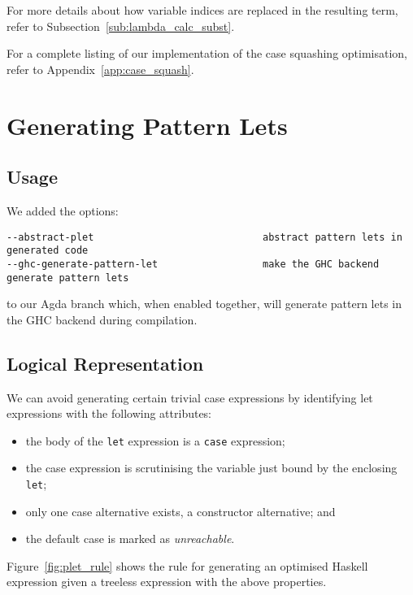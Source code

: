 For more details about how variable indices are replaced in the resulting term, refer to Subsection~\ref{sub:lambda_calc_subst}.

For a complete listing of our implementation of the case squashing optimisation, refer to Appendix~\ref{app:case_squash}.

\section{Generating Pattern Lets}
\label{sec:logical_plet}

\subsection{Usage}

We added the options:

\begin{verbatim}
--abstract-plet                             abstract pattern lets in generated code
--ghc-generate-pattern-let                  make the GHC backend generate pattern lets
\end{verbatim}

to our Agda branch which, when enabled together, will generate pattern lets in the GHC backend during compilation.

\subsection{Logical Representation}

We can avoid generating certain trivial case expressions by identifying let expressions with the following attributes:
\begin{itemize}
  \item the body of the \lstinline{let} expression is a \lstinline{case} expression;
  \item the case expression is scrutinising the variable just bound by the enclosing \lstinline{let};
  \item only one case alternative exists, a constructor alternative; and
  \item the default case is marked as \textit{unreachable}.
\end{itemize}

Figure~\ref{fig:plet_rule} shows the rule for generating an optimised Haskell expression given a treeless expression with the above properties.

